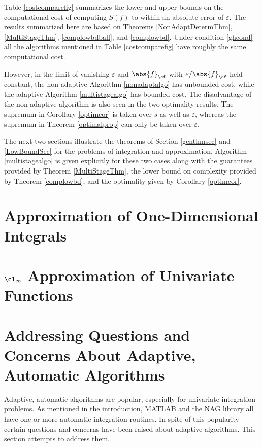 \documentclass[]{elsarticle}
\theoremstyle{definition}
\theoremstyle{remark}
\newcommand{\Fnorm}[1]{\abs{#1}_{\cf}}
\begin{document}
Table \ref{costcomparefig} summarizes the lower and upper bounds on the computational cost of computing $S(f)$ to within an absolute error of $\varepsilon$.  The results summarized here are based on Theorems \ref{NonAdaptDetermThm}, \ref{MultiStageThm}, \ref{complowbdball}, and \ref{complowbd}.  Under condition \eqref{ghcond} all the algorithms mentioned in Table \ref{costcomparefig} have roughly the same computational cost.  

However, in the limit of vanishing $\varepsilon$ and $\Fnorm{f}$ with $\varepsilon/\Fnorm{f}$ held constant, the non-adaptive Algorithm \ref{nonadaptalgo} has unbounded cost, while the adaptive Algorithm \ref{multistagealgo} has bounded cost. The disadvantage of the non-adaptive algorithm is also seen in the two optimality results.  The supremum in Corollary \ref{optimcor} is taken over $s$ as well as $\varepsilon$, whereas the supremum in Theorem \ref{optimalprop} can only be taken over $\varepsilon$.

The next two sections illustrate the theorems of Section \ref{genthmsec} and \ref{LowBoundSec} for the problems of integration and approximation. Algorithm \ref{multistagealgo} is given explicitly for these two cases along with the guarantees provided by Theorem \ref{MultiStageThm}, the lower bound on complexity provided by Theorem \ref{complowbd}, and the optimality given by Corollary \ref{optimcor}.

\section{Approximation of One-Dimensional Integrals} \label{integsec}



\section{$\cl_{\infty}$ Approximation of Univariate Functions} \label{approxsec}



\section{Addressing Questions and Concerns About Adaptive, Automatic Algorithms} \label{overcomesec}

Adaptive, automatic algorithms are popular, especially for univariate integration problems.  As mentioned in the introduction, MATLAB \cite{TrefEtal12,MAT7.12} and the NAG \cite{NAG23} library all have one or more automatic integration routines.  In spite of this popularity certain questions and concerns have been raised about adaptive algorithms.  This section attempts to address them.
\end{document}
